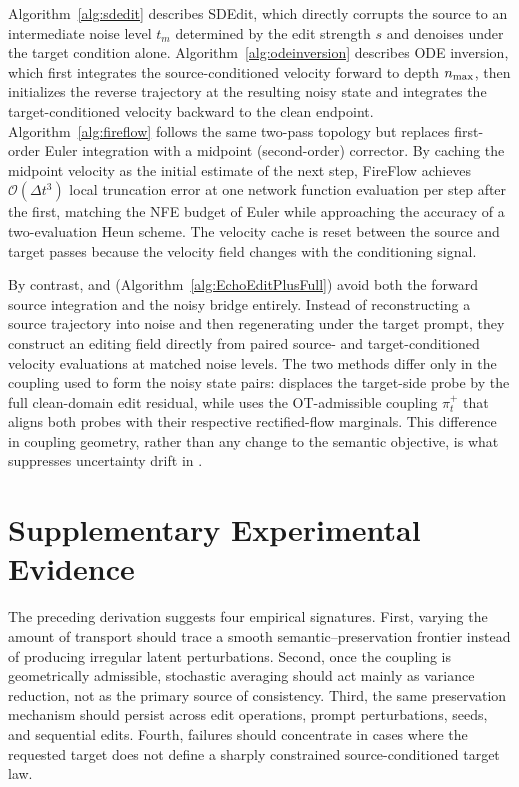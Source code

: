 Algorithm~\ref{alg:sdedit} describes SDEdit, which directly corrupts the source to an intermediate noise level $t_m$ determined by the edit strength $s$ and denoises under the target condition alone.
Algorithm~\ref{alg:odeinversion} describes ODE inversion, which first integrates the source-conditioned velocity forward to depth $n_{\max}$, then initializes the reverse trajectory at the resulting noisy state and integrates the target-conditioned velocity backward to the clean endpoint.
Algorithm~\ref{alg:fireflow} follows the same two-pass topology but replaces first-order Euler integration with a midpoint (second-order) corrector.
By caching the midpoint velocity as the initial estimate of the next step, FireFlow achieves $\mathcal{O}(\Delta t^3)$ local truncation error at one network function evaluation per step after the first, matching the NFE budget of Euler while approaching the accuracy of a two-evaluation Heun scheme.
The velocity cache is reset between the source and target passes because the velocity field changes with the conditioning signal.

By contrast, \method and \methodplus (Algorithm~\ref{alg:EchoEditPlusFull}) avoid both the forward source integration and the noisy bridge entirely.
Instead of reconstructing a source trajectory into noise and then regenerating under the target prompt, they construct an editing field directly from paired source- and target-conditioned velocity evaluations at matched noise levels.
The two methods differ only in the coupling used to form the noisy state pairs: \method displaces the target-side probe by the full clean-domain edit residual, while \methodplus uses the OT-admissible coupling $\pi_t^{+}$ that aligns both probes with their respective rectified-flow marginals.
This difference in coupling geometry, rather than any change to the semantic objective, is what suppresses uncertainty drift in \methodplus.

\section{Supplementary Experimental Evidence}
\label{app:supplementary_experiments}

The preceding derivation suggests four empirical signatures.
First, varying the amount of transport should trace a smooth semantic--preservation frontier instead of producing irregular latent perturbations.
Second, once the coupling is geometrically admissible, stochastic averaging should act mainly as variance reduction, not as the primary source of consistency.
Third, the same preservation mechanism should persist across edit operations, prompt perturbations, seeds, and sequential edits.
Fourth, failures should concentrate in cases where the requested target does not define a sharply constrained source-conditioned target law.

